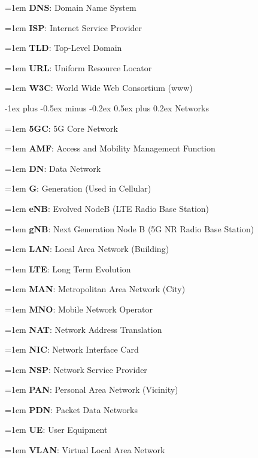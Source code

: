 \documentclass[letterpaper,8pt]{extarticle}
\makeatletter
\newcommand{\definition}[2]{
  \hangindent=1em
  \textbf{#1}: #2%
}
\renewcommand{\subsection}{\@startsection{subsection}{2}{0mm}%
  {-1ex plus -0.5ex minus -0.2ex}%
  {0.5ex plus 0.2ex}%
{\color{h2}\normalfont\fontsize{6}{6}\selectfont\bfseries}}
\makeatother
\begin{document}
\begin{multicols*}{5}
  \begin{multicols*}{2}
    
    \definition{DNS}{Domain Name System}
    
    \definition{ISP}{Internet Service Provider}
    
    \definition{TLD}{Top-Level Domain}
    
    \definition{URL}{Uniform Resource Locator}
    
    \definition{W3C}{World Wide Web Consortium (www)}
    
  \end{multicols*}
  
  \subsection{Networks}
  
  \begin{multicols*}{2}
    
    \definition{5GC}{5G Core Network}
    
    \definition{AMF}{Access and Mobility Management Function}
    
    \definition{DN}{Data Network}
    
    \definition{G}{Generation (Used in Cellular)}
    
    \definition{eNB}{Evolved NodeB (LTE Radio Base Station)}
    
    \definition{gNB}{Next Generation Node B (5G NR Radio Base Station)}
    
    \definition{LAN}{Local Area Network (Building)}
    
    \definition{LTE}{Long Term Evolution}
    
    \definition{MAN}{Metropolitan Area Network (City)}
    
    \definition{MNO}{Mobile Network Operator}
    
    \definition{NAT}{Network Address Translation}
    
    \definition{NIC}{Network Interface Card}
    
    \definition{NSP}{Network Service Provider}
    
    \definition{PAN}{Personal Area Network (Vicinity)}
    
    \definition{PDN}{Packet Data Networks}
    
    \definition{UE}{User Equipment}
    
    \definition{VLAN}{Virtual Local Area Network}
    

\end{multicols*}
\end{multicols*}
\end{document}
